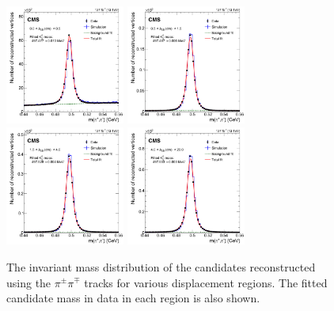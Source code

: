 \begin{figure}[h!]
    \centering
    \includegraphics[width=0.35\textwidth]{Figures/paper/ksinvmass_run2_fig_0.pdf}
    \includegraphics[width=0.35\textwidth]{Figures/paper/ksinvmass_run2_fig_1.pdf} \\
    \includegraphics[width=0.35\textwidth]{Figures/paper/ksinvmass_run2_fig_2.pdf}
    \includegraphics[width=0.35\textwidth]{Figures/paper/ksinvmass_run2_fig_3.pdf} \\
    \caption{\label{fig:invmass_mumuskim}
        The invariant mass distribution of the \PKzS candidates reconstructed using the $\pi^{\pm}\pi^{\mp}$ tracks for various displacement regions. The fitted \PKzS candidate mass in data in each region is also shown. \luka}
\end{figure}

